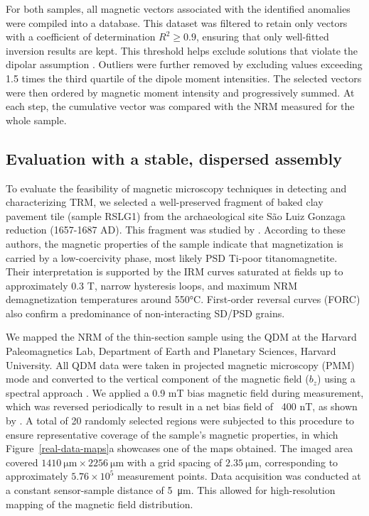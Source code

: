 For both samples, all magnetic vectors associated with the identified anomalies were compiled into a database. This dataset was filtered to retain only vectors with a coefficient of determination \( R^2 \geq 0.9 \), ensuring that only well-fitted inversion results are kept. This threshold helps exclude solutions that violate the dipolar assumption \citep[\textit{e.g.,}][]{Souza-Junior2024, Fu2020}. Outliers were further removed by excluding values exceeding 1.5 times the third quartile of the dipole moment intensities. The selected vectors were then ordered by magnetic moment intensity and progressively summed. At each step, the cumulative vector was compared with the NRM measured for the whole sample.

\subsection{Evaluation with a stable, dispersed assembly}

To evaluate the feasibility of magnetic microscopy techniques in detecting and characterizing TRM, we selected a well-preserved fragment of baked clay pavement tile (sample RSLG1) from the archaeological site São Luiz Gonzaga reduction (1657-1687 AD). This fragment was studied by \citet{Poletti2016}. According to these authors, the magnetic properties of the sample indicate that magnetization is carried by a low-coercivity phase, most likely PSD Ti-poor titanomagnetite. Their interpretation is supported by the IRM curves saturated at fields up to approximately 0.3 T, narrow hysteresis loops, and maximum NRM demagnetization temperatures around 550°C. First-order reversal curves (FORC) also confirm a predominance of non-interacting SD/PSD grains. 


We mapped the NRM of the thin-section sample using the QDM at the Harvard Paleomagnetics Lab, Department of Earth and Planetary Sciences, Harvard University. All QDM data were taken in projected magnetic microscopy (PMM) mode and converted to the vertical component of the magnetic field ($b_z$) using a spectral approach \citep{Fu2020, Glenn2017, Lima2009}. We applied a 0.9 mT bias magnetic field during measurement, which was reversed periodically to result in a net bias field of ~400 nT, as shown by \citet{Hess2024}. A total of 20 randomly selected regions were subjected to this procedure to ensure representative coverage of the sample's magnetic properties, in which Figure~\ref{real-data-maps}a showcases one of the maps obtained. The imaged area covered \(\qty{1410}{\um} \times \qty{2256}{\um}\) with a grid spacing of \(\qty{2.35}{\um}\), corresponding to approximately \(5.76\times10^{5}\) measurement points. Data acquisition was conducted at a constant sensor-sample distance of \qty{5}{\um}. This allowed for high-resolution mapping of the magnetic field distribution.

